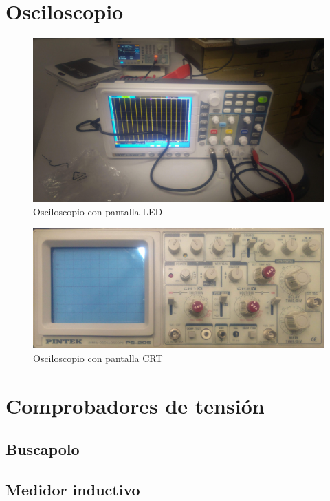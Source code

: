 \section{Osciloscopio}

\begin{figure}[htbp]
  \centering
  \includegraphics[width=\textwidth,height=\textheight,keepaspectratio]{images/fotos/osciloscopio1.jpg}
  \caption{Osciloscopio con pantalla LED}
  \label{fig:osciloscopio_led}
\end{figure}

\begin{figure}[htbp]
  \centering
  \includegraphics[width=\textwidth,height=\textheight,keepaspectratio]{images/fotos/osciloscopio2.jpg}
  \caption{Osciloscopio con pantalla CRT}
  \label{fig:osciloscopio_crt}
\end{figure}

\section{Comprobadores de tensión}
\subsection{Buscapolo}
\subsection{Medidor inductivo}
